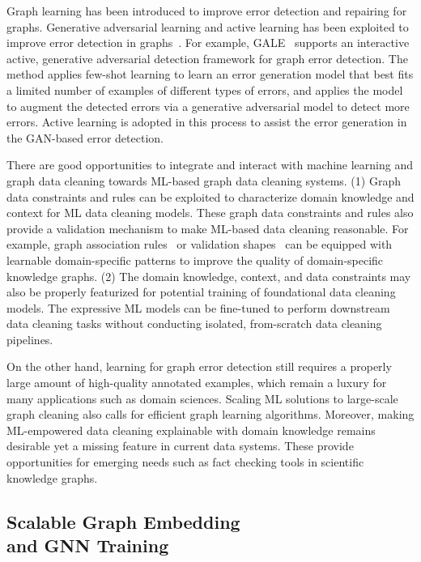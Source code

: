 \documentclass{sig-alternate-10pt}
\newcommand{\spara}[1]{\smallskip\noindent{\bf #1}}
\begin{document}
Graph learning
has been introduced to improve
error detection and repairing for graphs.
 Generative adversarial learning and
active learning has been
exploited to improve
error detection in
graphs~\cite{gdet, guan2023gale}. For example, GALE~\cite{guan2023gale}
supports an interactive
active, generative adversarial detection framework
for graph error detection.
The method applies few-shot learning
to learn an error generation model
that best fits a limited number of
examples of different types of errors, and applies the
model to augment
the detected errors via a generative
adversarial model to detect more
errors. Active learning is adopted in
this process to assist the
error generation in the GAN-based
error detection.

\spara{Synergy.} There are good  opportunities to integrate and interact with machine learning and graph data cleaning towards ML-based
graph data cleaning systems.
(1) Graph data constraints and
rules can be exploited to characterize
domain knowledge and context for
ML data cleaning models.
These graph data constraints and
rules also provide a validation mechanism to make ML-based data cleaning reasonable.
For example, graph association rules~\cite{FanJLLTZ20} or
validation shapes~\cite{rabbani2023shactor}
can be equipped with
learnable domain-specific patterns to
improve the quality of domain-specific knowledge graphs.
(2) The domain knowledge, context, and data constraints may also be properly featurized for potential
training of foundational data cleaning
models. The expressive ML models can be fine-tuned to perform downstream data cleaning
tasks without conducting isolated,
from-scratch data cleaning pipelines.

On the other hand,
 learning for
graph error detection still requires
a properly large amount of
high-quality annotated
examples, which remain a luxury for many applications such as
domain sciences. Scaling
ML solutions to large-scale
graph cleaning also calls for efficient graph
learning algorithms.
Moreover, making ML-empowered
data cleaning explainable
with domain knowledge
remains desirable yet a missing
feature in current data systems.
These provide opportunities for
emerging needs such as
fact checking tools
in scientific knowledge graphs.

\subsection{Scalable Graph Embedding \\ and GNN Training}
\label{sec:embedding}
\end{document}
